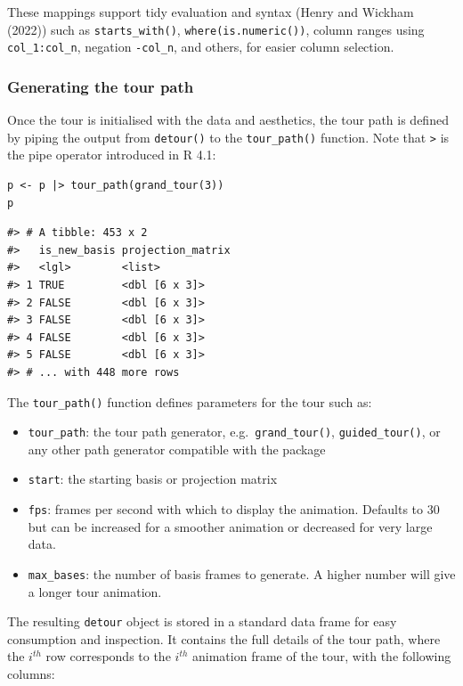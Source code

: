 These mappings support tidy evaluation and  syntax (Henry and Wickham (2022)) such as \texttt{starts\_with()}, \texttt{where(is.numeric())}, column ranges using \texttt{col\_1:col\_n}, negation \texttt{-col\_n}, and others, for easier column selection.

\hypertarget{generating-the-tour-path}{%
\subsubsection{Generating the tour path}\label{generating-the-tour-path}}

Once the tour is initialised with the data and aesthetics, the tour path is defined by piping the output from \texttt{detour()} to the \texttt{tour\_path()} function. Note that \texttt{\textbar{}\textgreater{}} is the pipe operator introduced in R 4.1:

\pagebreak

\begin{verbatim}
p <- p |> tour_path(grand_tour(3))
p
\end{verbatim}

\begin{verbatim}
#> # A tibble: 453 x 2
#>   is_new_basis projection_matrix
#>   <lgl>        <list>           
#> 1 TRUE         <dbl [6 x 3]>    
#> 2 FALSE        <dbl [6 x 3]>    
#> 3 FALSE        <dbl [6 x 3]>    
#> 4 FALSE        <dbl [6 x 3]>    
#> 5 FALSE        <dbl [6 x 3]>    
#> # ... with 448 more rows
\end{verbatim}

The \texttt{tour\_path()} function defines parameters for the tour such as:

\begin{itemize}
\tightlist
\item
  \texttt{tour\_path}: the tour path generator, e.g.~\texttt{grand\_tour()}, \texttt{guided\_tour()}, or any other path generator compatible with the  package
\item
  \texttt{start}: the starting basis or projection matrix
\item
  \texttt{fps}: frames per second with which to display the animation. Defaults to 30 but can be increased for a smoother animation or decreased for very large data.
\item
  \texttt{max\_bases}: the number of basis frames to generate. A higher number will give a longer tour animation.
\end{itemize}

The resulting \texttt{detour} object is stored in a standard data frame for easy consumption and inspection. It contains the full details of the tour path, where the \(i^{th}\) row corresponds to the \(i^{th}\) animation frame of the tour, with the following columns:

